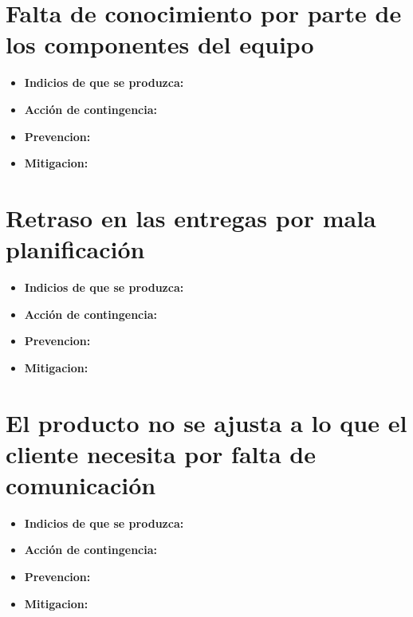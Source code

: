 \documentclass[spanish,a4paper,12pt]{report}	%
\begin{document}
	\section*{Falta de conocimiento por parte de los componentes del equipo}
		\begin{itemize}
			\item \textbf {Indicios de que se produzca: }%
			\item \textbf {Acción de contingencia: }
			\item \textbf {Prevencion: }%
			\item \textbf {Mitigacion: }
		\end{itemize}
	
	\section*{Retraso en las entregas por mala planificación}
		\begin{itemize}
			\item \textbf {Indicios de que se produzca: }
			\item \textbf {Acción de contingencia: }
			\item \textbf {Prevencion: }
			\item \textbf {Mitigacion: }
		\end{itemize}
	
	\section*{El producto no se ajusta a lo que el cliente necesita por falta de comunicación}
		\begin{itemize}
			\item \textbf {Indicios de que se produzca: }
			\item \textbf {Acción de contingencia: }
			\item \textbf {Prevencion: }
			\item \textbf {Mitigacion: }
		\end{itemize}
	
	
		


\newpage
\mbox{}
\thispagestyle{empty}						%
\newpage
\end{document}
